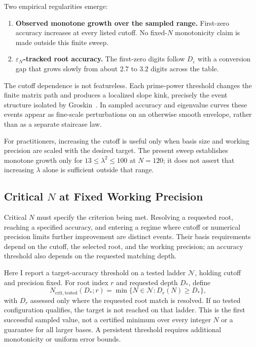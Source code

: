 \documentclass[11pt,a4paper]{article}
\begin{document}
Two empirical regularities emerge:
\begin{enumerate}
\item \textbf{Observed monotone growth over the sampled range.}
First-zero accuracy increases at every listed cutoff. No fixed-$N$
monotonicity claim is made outside this finite sweep.
\item \textbf{$\varepsilon_N$-tracked root accuracy.}
The first-zero digits follow $D_{\varepsilon}$ with a conversion gap
that grows slowly from about $2.7$ to $3.2$ digits across the table.
\end{enumerate}

The cutoff dependence is not featureless. Each prime-power threshold
changes the finite matrix path and produces a localized slope kink,
precisely the event structure isolated by
Groskin~\cite{Groskin2026MatrixVonMangoldt}. In sampled accuracy and
eigenvalue curves these events appear as fine-scale perturbations on
an otherwise smooth envelope, rather than as a separate staircase law.

For practitioners, increasing the cutoff is useful only when basis
size and working precision are scaled with the desired target. The
present sweep establishes monotone growth only for
$13\leq\lambda^2\leq100$ at $N=120$; it does not assert that increasing
$\lambda$ alone is sufficient outside that range.

\subsection{\texorpdfstring{Critical $N$ at Fixed Working Precision}
{Critical N at Fixed Working Precision}}
\label{sec:critical_N}

Critical $N$ must specify the criterion being met. Resolving a requested
root, reaching a specified accuracy, and entering a regime where cutoff
or numerical precision limits further improvement are distinct events.
Their basis requirements depend on the cutoff, the selected root, and
the working precision; an accuracy threshold also depends on the
requested matching depth.

Here I report a target-accuracy threshold on a tested ladder
$\mathcal N$, holding cutoff and precision fixed. For root index $r$
and requested depth $D_*$, define
\[
N_{\mathrm{crit,tested}}(D_*;r)
 =\min\{N\in\mathcal N:D_r(N)\ge D_*\},
\]
with $D_r$ assessed only where the requested root match is resolved.
If no tested configuration qualifies, the target is not reached on
that ladder. This is the first successful sampled value, not a
certified minimum over every integer $N$ or a guarantee for all larger
bases. A persistent threshold requires additional monotonicity or
uniform error bounds.
\end{document}
